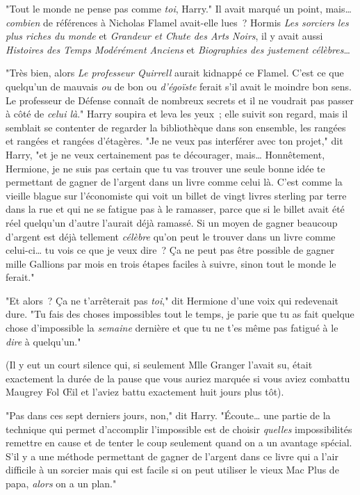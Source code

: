"Tout le monde ne pense pas comme \emph{toi}, Harry." Il avait marqué un point, mais… \emph{combien} de références à Nicholas Flamel avait-elle lues~? Hormis \emph{Les sorciers les plus riches du monde} et \emph{Grandeur et Chute des Arts Noirs}, il y avait aussi \emph{Histoires des Temps Modérément Anciens} et \emph{Biographies des justement célèbres}…

"Très bien, alors \emph{Le professeur Quirrell} aurait kidnappé ce Flamel. C'est ce que quelqu'un de mauvais \emph{ou} de bon ou \emph{d'égoïste} ferait s'il avait le moindre bon sens. Le professeur de Défense connaît de nombreux secrets et il ne voudrait pas passer à côté de \emph{celui là}." Harry soupira et leva les yeux~; elle suivit son regard, mais il semblait se contenter de regarder la bibliothèque dans son ensemble, les rangées et rangées et rangées d'étagères. "Je ne veux pas interférer avec ton projet," dit Harry, "et je ne veux certainement pas te décourager, mais… Honnêtement, Hermione, je ne suis pas certain que tu vas trouver une seule bonne idée te permettant de gagner de l'argent dans un livre comme celui là. C'est comme la vieille blague sur l'économiste qui voit un billet de vingt livres sterling par terre dans la rue et qui ne se fatigue pas à le ramasser, parce que si le billet avait été réel quelqu'un d'autre l'aurait déjà ramassé. Si un moyen de gagner beaucoup d'argent est déjà tellement \emph{célèbre} qu'on peut le trouver dans un livre comme celui-ci… tu vois ce que je veux dire~? Ça ne peut pas être possible de gagner mille Gallions par mois en trois étapes faciles à suivre, sinon tout le monde le ferait."

"Et alors~? Ça ne t'arrêterait pas \emph{toi}," dit Hermione d'une voix qui redevenait dure. "Tu fais des choses impossibles tout le temps, je parie que tu as fait quelque chose d'impossible la \emph{semaine} dernière et que tu ne t'es même pas fatigué à le \emph{dire} à quelqu'un."

(Il y eut un court silence qui, si seulement Mlle Granger l'avait su, était exactement la durée de la pause que vous auriez marquée si vous aviez combattu Maugrey Fol Œil et l'aviez battu exactement huit jours plus tôt).

"Pas dans ces sept derniers jours, non," dit Harry. "Écoute… une partie de la technique qui permet d'accomplir l'impossible est de choisir \emph{quelles} impossibilités remettre en cause et de tenter le coup seulement quand on a un avantage spécial. S'il y a une méthode permettant de gagner de l'argent dans ce livre qui a l'air difficile à un sorcier mais qui est facile si on peut utiliser le vieux Mac Plus de papa, \emph{alors} on a un plan."

